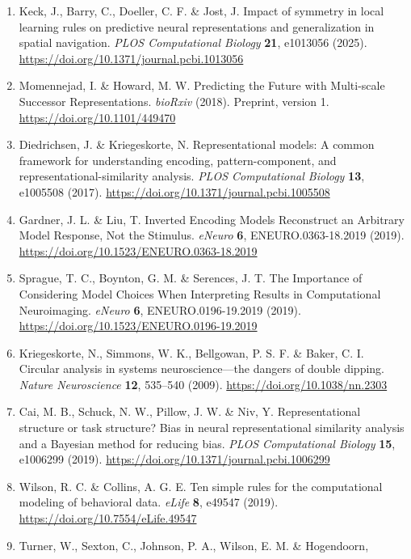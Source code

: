 \documentclass[11pt,a4paper]{article}
\begin{document}
\begin{enumerate}
  1726–1737 (2024). Publisher correction: 10.1038/s41562-024-01978-6.
  \url{https://doi.org/10.1038/s41562-024-01930-8}
\item
  Keck, J., Barry, C., Doeller, C. F. \& Jost, J. Impact of symmetry in
  local learning rules on predictive neural representations and
  generalization in spatial navigation. \emph{PLOS Computational
  Biology} \textbf{21}, e1013056 (2025).
  \url{https://doi.org/10.1371/journal.pcbi.1013056}
\item
  Momennejad, I. \& Howard, M. W. Predicting the Future with Multi-scale
  Successor Representations. \emph{bioRxiv} (2018). Preprint, version 1.
  \url{https://doi.org/10.1101/449470}
\item
  Diedrichsen, J. \& Kriegeskorte, N. Representational models: A common
  framework for understanding encoding, pattern-component, and
  representational-similarity analysis. \emph{PLOS Computational
  Biology} \textbf{13}, e1005508 (2017).
  \url{https://doi.org/10.1371/journal.pcbi.1005508}
\item
  Gardner, J. L. \& Liu, T. Inverted Encoding Models Reconstruct an
  Arbitrary Model Response, Not the Stimulus. \emph{eNeuro} \textbf{6},
  ENEURO.0363-18.2019 (2019).
  \url{https://doi.org/10.1523/ENEURO.0363-18.2019}
\item
  Sprague, T. C., Boynton, G. M. \& Serences, J. T. The Importance of
  Considering Model Choices When Interpreting Results in Computational
  Neuroimaging. \emph{eNeuro} \textbf{6}, ENEURO.0196-19.2019 (2019).
  \url{https://doi.org/10.1523/ENEURO.0196-19.2019}
\item
  Kriegeskorte, N., Simmons, W. K., Bellgowan, P. S. F. \& Baker, C. I.
  Circular analysis in systems neuroscience—the dangers of double
  dipping. \emph{Nature Neuroscience} \textbf{12}, 535–540 (2009).
  \url{https://doi.org/10.1038/nn.2303}
\item
  Cai, M. B., Schuck, N. W., Pillow, J. W. \& Niv, Y. Representational
  structure or task structure? Bias in neural representational
  similarity analysis and a Bayesian method for reducing bias.
  \emph{PLOS Computational Biology} \textbf{15}, e1006299 (2019).
  \url{https://doi.org/10.1371/journal.pcbi.1006299}
\item
  Wilson, R. C. \& Collins, A. G. E. Ten simple rules for the
  computational modeling of behavioral data. \emph{eLife} \textbf{8},
  e49547 (2019). \url{https://doi.org/10.7554/eLife.49547}
\item
  Turner, W., Sexton, C., Johnson, P. A., Wilson, E. M. \& Hogendoorn,

\end{enumerate}
\end{document}

